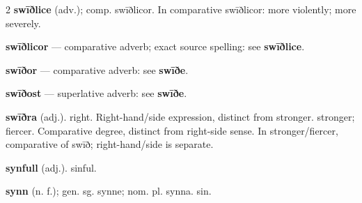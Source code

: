 \begin{multicols*}{2}
\textbf{swīðlice} (adv.); comp. swīðlicor. In comparative swīðlicor: more violently; more severely.\par
\textbf{swīðlicor} — comparative adverb; exact source spelling: see \textbf{swīðlice}.\par
\textbf{swīðor} — comparative adverb: see \textbf{swīðe}.\par
\textbf{swīðost} — superlative adverb: see \textbf{swīðe}.\par
\textbf{swīðra} (adj.). right. Right-hand/side expression, distinct from stronger. stronger; fiercer. Comparative degree, distinct from right-side sense. In stronger/fiercer, comparative of swīð; right-hand/side is separate.\par
\textbf{synfull} (adj.). sinful.\par
\textbf{synn} (n. f.); gen. sg. synne; nom. pl. synna. sin.\par

\end{multicols*}
